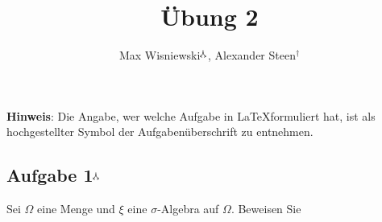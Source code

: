 \documentclass[11pt,a4paper,ngerman]{article}
\date{}
\title{Übung 2}
\author{Max Wisniewski$^\curlywedgedownarrow$, Alexander Steen$^\dagger$}
\begin{document}

\renewcommand{\figurename}{Figure}

\maketitle
\thispagestyle{fancy}

\begin{center}
\textbf{Hinweis}: Die Angabe, wer welche Aufgabe in \LaTeX formuliert hat, ist als hochgestellter Symbol der Aufgabenüberschrift zu entnehmen.
\end{center}


\subsection*{Aufgabe 1$^\curlywedgedownarrow$}
Sei $\Omega$ eine Menge und $\xi$ eine $\sigma$-Algebra auf $\Omega$. Beweisen Sie
\end{document}
